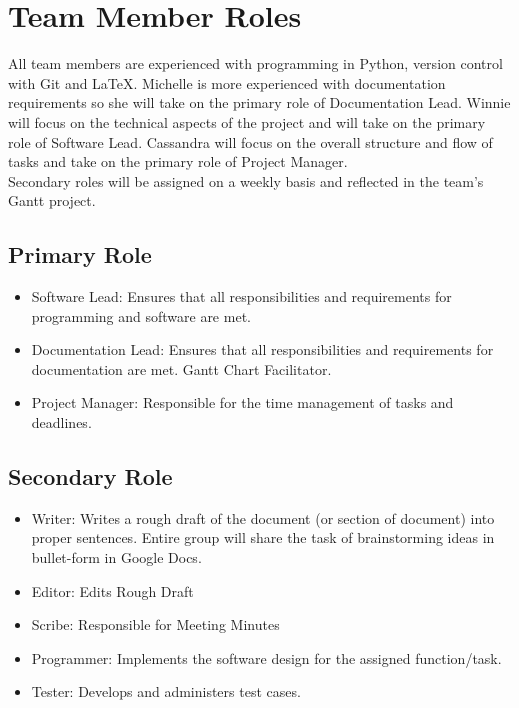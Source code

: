 \documentclass{article}
\begin{document}
\section{Team Member Roles}
\hspace{5mm}All team members are experienced with programming in Python, version control with Git and LaTeX. Michelle is more experienced with documentation requirements so she will take on the primary role of Documentation Lead. Winnie will focus on the technical aspects of the project and will take on the primary role of Software Lead. Cassandra will focus on the overall structure and flow of tasks and take on the primary role of Project Manager.\\

Secondary roles will be assigned on a weekly basis and reflected in the team's Gantt project.

\subsection{Primary Role}
\begin{itemize}
\item Software Lead: Ensures that all responsibilities and requirements for programming and software are met. 
\item Documentation Lead: Ensures that all responsibilities and requirements for documentation are met. Gantt Chart Facilitator.
\item Project Manager: Responsible for the time management of tasks and deadlines.
\end{itemize}

\subsection{Secondary Role}
\begin{itemize}
\item Writer: Writes a rough draft of the document (or section of document) into proper sentences. Entire group will share the task of brainstorming ideas in bullet-form in Google Docs.
\item Editor: Edits Rough Draft
\item Scribe: Responsible for Meeting Minutes 
\item Programmer: Implements the software design for the assigned function/task.
\item Tester: Develops and administers test cases.
\end{itemize}
\end{document}
